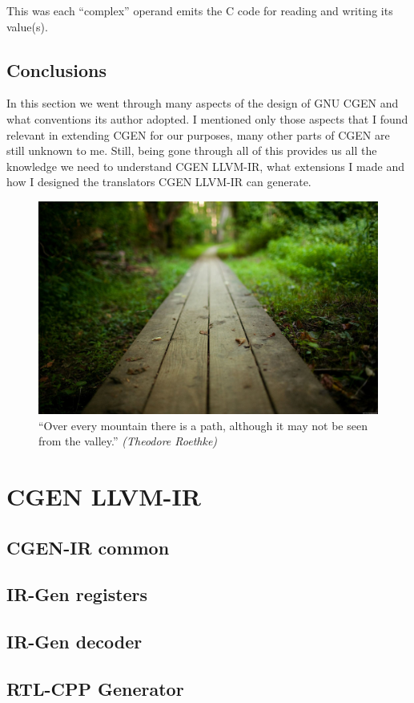 \documentclass{article}
\begin{document}
This was each ``complex'' operand emits the C code for reading and writing its value(s).

\subsection{Conclusions}
In this section we went through many aspects of the design of GNU CGEN and what conventions its author adopted. I mentioned only those aspects that I found relevant in extending CGEN for our purposes, many other parts of CGEN are still unknown to me. Still, being gone through all of this provides us all the knowledge we need to understand CGEN LLVM-IR, what extensions I made and how I designed the translators CGEN LLVM-IR can generate.
\vfill

\begin{figure}[H]
  \centering
    \includegraphics[width=1.0\textwidth]{path_2}
  \caption{``Over every mountain there is a path, although it may not be seen from the valley.'' \emph{(Theodore Roethke)}}
  \label{fig:gull}
\end{figure}
\clearpage
\section{CGEN LLVM-IR} \label{sec:cgen-llvm-ir}
\subsection{CGEN-IR common}
\subsection{IR-Gen registers}
\subsection{IR-Gen decoder}
\subsection{RTL-CPP Generator}
\end{document}
